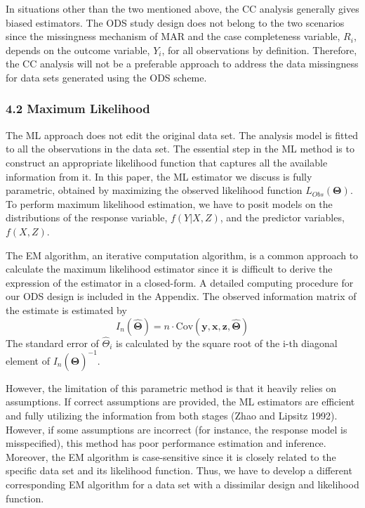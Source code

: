\documentclass[
  12pt,
]{article}
\begin{document}
In situations other than the two mentioned above, the CC analysis
generally gives biased estimators. The ODS study design does not belong
to the two scenarios since the missingness mechanism of MAR and the case
completeness variable, \(R_i\), depends on the outcome variable,
\(Y_i\), for all observations by definition. Therefore, the CC analysis
will not be a preferable approach to address the data missingness for
data sets generated using the ODS scheme.

\hypertarget{maximum-likelihood}{%
\subsubsection{4.2 Maximum Likelihood}\label{maximum-likelihood}}

The ML approach does not edit the original data set. The analysis model
is fitted to all the observations in the data set. The essential step in
the ML method is to construct an appropriate likelihood function that
captures all the available information from it. In this paper, the ML
estimator we discuss is fully parametric, obtained by maximizing the
observed likelihood function \(L_{Obs}(\boldsymbol{\Theta})\). To
perform maximum likelihood estimation, we have to posit models on the
distributions of the response variable, \(f(Y|X, Z)\), and the predictor
variables, \(f(X, Z)\).

The EM algorithm, an iterative computation algorithm, is a common
approach to calculate the maximum likelihood estimator since it is
difficult to derive the expression of the estimator in a closed-form. A
detailed computing procedure for our ODS design is included in the
Appendix. The observed information matrix of the estimate is estimated
by \[ 
I_n (\hat{\boldsymbol{\Theta}}) = n \cdot \mathrm{Cov}(\boldsymbol{y}, \boldsymbol{x}, \boldsymbol{z}, \hat{\boldsymbol{\Theta}})
\] The standard error of \(\hat\Theta_i\) is calculated by the square
root of the i-th diagonal element of
\(I_n(\hat{\boldsymbol{\Theta}})^{-1}\).

However, the limitation of this parametric method is that it heavily
relies on assumptions. If correct assumptions are provided, the ML
estimators are efficient and fully utilizing the information from both
stages (Zhao and Lipsitz 1992). However, if some assumptions are
incorrect (for instance, the response model is misspecified), this
method has poor performance estimation and inference. Moreover, the EM
algorithm is case-sensitive since it is closely related to the specific
data set and its likelihood function. Thus, we have to develop a
different corresponding EM algorithm for a data set with a dissimilar
design and likelihood function.
\end{document}
